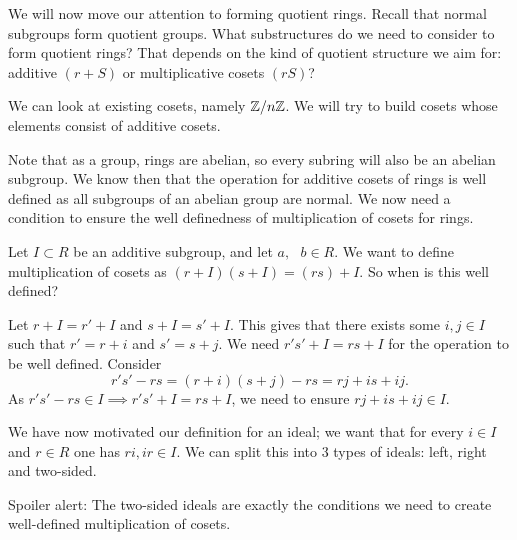 We will now move our attention to forming quotient rings. Recall that normal subgroups form quotient groups. What substructures do we need to consider to form quotient rings?
That depends on the kind of quotient structure we aim for: additive $(r+S)$ or
multiplicative cosets $(rS)$?

We can look at existing cosets, namely $\mathbb Z/n\mathbb Z$. We will
try to build cosets whose elements consist of additive cosets. 

Note that as a group, rings are abelian, so every subring will
also be an abelian subgroup. We know then that the operation for additive cosets of rings is well defined as all subgroups of an abelian group are normal. We now need a condition to ensure the well definedness of multiplication of cosets for rings.

Let $I\subset R$ be an additive subgroup, and let $a,\text{ }b\in R$.
We want to define multiplication of cosets as $(r+I)(s+I)=(rs)+I$. So when is this well defined?

Let $r + I = r' + I$ and $s + I = s'+ I$. This gives that there exists some $i,j \in I$ such that $r' = r + i$ and $s' = s + j$. We need $r's' + I = rs + I$ for the operation to be well defined.
Consider
$$
r's' - rs = (r+i)(s+j) - rs = rj + is + ij.
$$
As $r's'-rs \in I \implies r's' + I = rs + I$, we need to ensure $rj + is + ij\in I.$

We have now motivated our definition for an ideal; we want that for every $i \in I$ and $r \in R$ one has $ri, ir \in I$. We can split this into 3 types of ideals: left, right and two-sided.

\begin{remark}
    Spoiler alert: The two-sided ideals are exactly the conditions we need to create well-defined multiplication of cosets. 
\end{remark}



